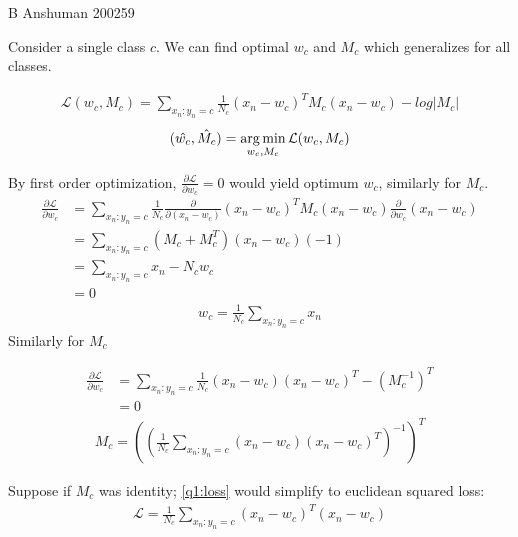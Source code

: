 \documentclass[a4paper,11pt]{article}
\begin{document}
{B Anshuman}   %
{200259}	%

\begin{mlsolution}

Consider a single class $c$. We can find optimal $w_c$ and $M_c$ which generalizes for all classes.

\begin{align}\label{q1:loss}
    \mathcal{L}(w_c, M_c) = \sum_{x_n: y_n=c} \frac{1}{N_c} (x_n - w_c)^T M_c (x_n - w_c) - log \vert M_c \vert
\end{align}
$$
    (\hat{w_c}, \hat{M_c}) = \mathop{\arg\min} _{w_c, M_c} \mathcal{L}(w_c, M_c)
$$

By first order optimization, $\frac{\partial \mathcal{L}}{\partial w_c} = 0$ would yield optimum $w_c$, similarly for $M_c$.
\begin{align*}
    \frac{\partial \mathcal{L}}{\partial w_c} & = \sum_{x_n:y_n=c} \frac{1}{N_c} \frac{\partial}{\partial (x_n - w_c)} (x_n - w_c)^T M_c (x_n - w_c) \frac{\partial}{\partial w_c} (x_n - w_c) \\
    & = \sum_{x_n:y_n = c} (M_c + M_c^T) (x_n - w_c) (-1) \\
    & = \sum_{x_n:y_n = c} x_n - N_c w_c \\
    & = 0
\end{align*}
\begin{align} \label{q1:optimalwc}
w_c = \frac{1}{N_c} \sum_{x_n:y_n = c} x_n    
\end{align}
Similarly for $M_c$

\begin{align*}
    \frac{\partial\mathcal{L}}{\partial w_c} & = \sum_{x_n:y_n = c} \frac{1}{N_c} (x_n - w_c)(x_n - w_c)^T - (M_c^{-1})^T \\
    & = 0
\end{align*}
\begin{align} \label{q1:optimalmc}
M_c = \left(\left(\frac{1}{N_c} \sum_{x_n:y_n = c} (x_n - w_c)(x_n - w_c)^T\right)^{-1}\right)^T
\end{align}

Suppose if $M_c$ was identity; \ref{q1:loss} would simplify to euclidean squared loss:
\begin{align}
    \mathcal{L} = \frac{1}{N_c} \sum_{x_n:y_n=c} (x_n - w_c)^T (x_n - w_c)
\end{align} 

\end{mlsolution}
\end{document}
